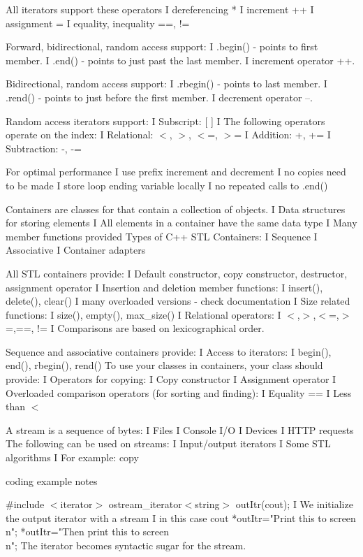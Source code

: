 \documentclass{article}
\begin{document}
{All iterators support these operators
I dereferencing *
I increment ++
I assignment =
I equality, inequality ==, !=


Forward, bidirectional, random access support:
I .begin() - points to first member.
I .end() - points to just past the last member.
I increment operator ++.


Bidirectional, random access support:
I .rbegin() - points to last member.
I .rend() - points to just before the first member.
I decrement operator --.


Random access iterators support:
I Subscript: [ ]
I The following operators operate on the index:
I Relational: $<$, $>$, $<$=, $>$=
I Addition: +, +=
I Subtraction: -, -=


For optimal performance
I use prefix increment and decrement
I no copies need to be made
I store loop ending variable locally
I no repeated calls to .end()


Containers are classes for that contain a collection of objects.
I Data structures for storing elements
I All elements in a container have the same data type
I Many member functions provided
Types of C++ STL Containers:
I Sequence
I Associative
I Container adapters


All STL containers provide:
I Default constructor, copy constructor, destructor, assignment operator
I Insertion and deletion member functions:
I insert(), delete(), clear()
I many overloaded versions - check documentation
I Size related functions:
I size(), empty(), max\_size()
I Relational operators:
I $<$,$>$,$<$=,$>$=,==, !=
I Comparisons are based on lexicographical order.


Sequence and associative containers provide:
I Access to iterators:
I begin(), end(), rbegin(), rend()
To use your classes in containers, your class should provide:
I Operators for copying:
I Copy constructor
I Assignment operator
I Overloaded comparison operators (for sorting and finding):
I Equality ==
I Less than $<$


A stream is a sequence of bytes:
I Files
I Console I/O
I Devices
I HTTP requests
The following can be used on streams:
I Input/output iterators
I Some STL algorithms
I For example: copy

coding example notes 

\#include $<$iterator$>$
ostream\_iterator$<$string$>$ outItr(cout);
I We initialize the output iterator with a stream
I in this case cout
*outItr="Print this to screen\\n";
*outItr="Then print this to screen\\n";
The iterator becomes syntactic sugar for the stream.

}
\end{document}
